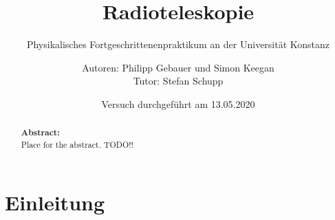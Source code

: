 

 
 \title{Radioteleskopie}
 \subtitle{Physikalisches Fortgeschrittenenpraktikum an der Universität Konstanz}
 \author{Autoren: Philipp Gebauer und Simon Keegan \\ \large{Tutor: Stefan Schupp}}
 \date{Versuch durchgeführt am 13.05.2020}
 \maketitle
 \vspace{2.5 cm}
 \begin{abstract}
     \noindent \textbf{Abstract:}\\
     Place for the abstract. TODO!!
     \vspace{1cm}
     
     \end{abstract}
 \thispagestyle{empty}
 \newpage
 
 \tableofcontents
 \thispagestyle{empty}
 \newpage
 \setcounter{page}{1}    
 
\section{Einleitung}
